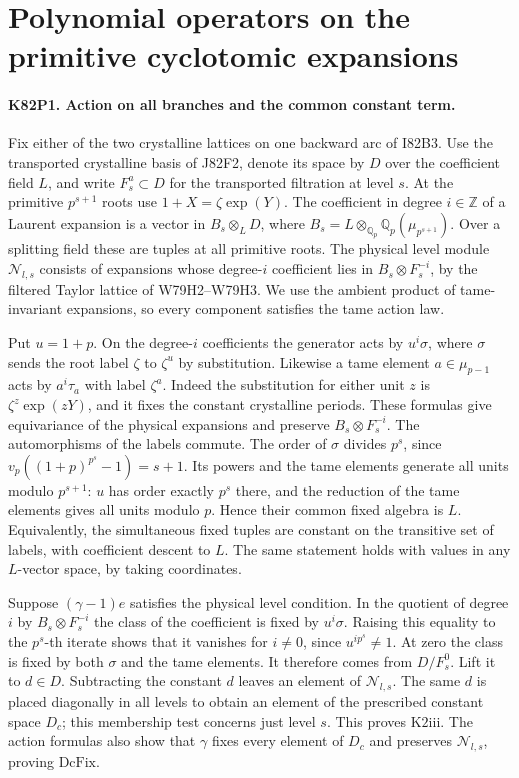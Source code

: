 \section{Polynomial operators on the primitive cyclotomic expansions}

\paragraph{K82P1. Action on all branches and the common constant term.}
Fix either of the two crystalline lattices on one backward arc of
I82B3. Use the transported crystalline basis of J82F2, denote its
space by $D$ over the coefficient field $L$, and write
$F_s^a\subset D$ for the transported filtration at level $s$.
At the primitive $p^{s+1}$ roots use $1+X=\zeta\exp(Y)$.
The coefficient in degree $i\in\mathbb Z$ of a Laurent expansion
is a vector in $B_s\otimes_L D$, where
$B_s=L\otimes_{\mathbb Q_p}\mathbb Q_p(\mu_{p^{s+1}})$.
Over a splitting field these are tuples at all primitive roots.
The physical level module $\mathcal N_{l,s}$ consists of expansions
whose degree-$i$ coefficient lies in $B_s\otimes F_s^{-i}$,
by the filtered Taylor lattice of W79H2--W79H3. We use the
ambient product of tame-invariant expansions, so every component
satisfies the tame action law.

Put $u=1+p$. On the degree-$i$ coefficients the generator acts by
$u^i\sigma$, where $\sigma$ sends the root label $\zeta$ to
$\zeta^u$ by substitution. Likewise a tame element $a\in\mu_{p-1}$
acts by $a^i\tau_a$ with label $\zeta^a$. Indeed the substitution
for either unit $z$ is $\zeta^z\exp(zY)$, and it fixes the
constant crystalline periods. These formulas give equivariance
of the physical expansions and preserve $B_s\otimes F_s^{-i}$.
The automorphisms of the labels commute. The order of $\sigma$
divides $p^s$, since $v_p((1+p)^{p^s}-1)=s+1$. Its powers
and the tame elements generate all units modulo $p^{s+1}$:
$u$ has order exactly $p^s$ there, and the reduction of the
tame elements gives all units modulo $p$. Hence their common
fixed algebra is $L$. Equivalently, the simultaneous fixed
tuples are constant on the transitive set of labels, with
coefficient descent to $L$. The same statement holds with
values in any $L$-vector space, by taking coordinates.

Suppose $(\gamma-1)e$ satisfies the physical level condition.
In the quotient of degree $i$ by $B_s\otimes F_s^{-i}$ the class
of the coefficient is fixed by $u^i\sigma$. Raising this equality
to the $p^s$-th iterate shows that it vanishes for $i\ne0$,
since $u^{ip^s}\ne1$. At zero the class is fixed by both
$\sigma$ and the tame elements. It therefore comes from
$D/F_s^0$. Lift it to $d\in D$. Subtracting the constant $d$
leaves an element of $\mathcal N_{l,s}$. The same $d$ is placed
diagonally in all levels to obtain an element of the prescribed
constant space $D_c$; this membership test concerns just level
$s$. This proves $\mathrm{K2iii}$. The action formulas also
show that $\gamma$ fixes every element of $D_c$ and preserves
$\mathcal N_{l,s}$, proving $\mathrm{DcFix}$.

